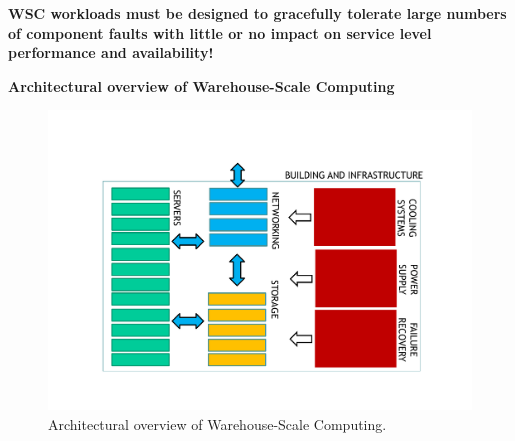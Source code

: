 \highspace
\textbf{WSC workloads must be designed to gracefully tolerate large numbers of component faults with little or no impact on service level performance and availability!}

\hfill

\longline

\hfill

\begin{center}
    \textcolor{Red2}{\textbf{Architectural overview of Warehouse-Scale Computing}}
\end{center}

\begin{figure}[!htp]
    \centering
    \includegraphics[width=\textwidth]{img/WSC-architecture-1.pdf}
    \caption{Architectural overview of Warehouse-Scale Computing.}
\end{figure}

\newpage

